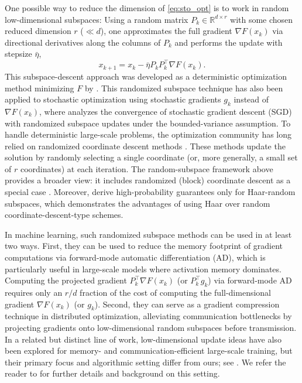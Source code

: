\documentclass[10pt]{article}
\begin{document}
One possible way to reduce the dimension of \eqref{eq:sto_opt} is to work in random low-dimensional subspaces: Using a random matrix $P_k \in \mathbb{R}^{d \times r}$ with some chosen reduced dimension $r$ ($\ll d$), one approximates the full gradient $\nabla F(x_k)$ via directional derivatives along the columns of $P_k$ and performs the update with stepsize $\bar{\eta}$,
\[
  x_{k+1} = x_k - \bar{\eta} P_k P_k^\top \nabla F(x_k).
\]
This subspace-descent approach was developed as a deterministic optimization method minimizing $F$ by \citet{kozak2021}. This randomized subspace technique has also been applied to stochastic optimization using stochastic gradients $g_k$ instead of $\nabla F(x_k)$, where \citet{flynn2024} analyzes the convergence of stochastic gradient descent (SGD) with 
randomized subspace updates under the bounded-variance assumption. To handle deterministic large-scale problems, the optimization community has long relied on randomized coordinate descent methods \cite{nesterov2012,richtarik2014,wright2015}.
These methods update the solution by randomly selecting a single coordinate (or, more generally, a small set of $r$ coordinates) at each iteration.
The random-subspace framework above provides a broader view: it includes randomized (block) coordinate descent as a special case \cite{kozak2021}.
Moreover, \citet{kozak2021} derive high-probability guarantees only for Haar-random subspaces, which demonstrates the advantages of using Haar over random coordinate-descent-type schemes.


In machine learning, such randomized subspace methods can be used in at least two ways.
First, they can be used to reduce the memory footprint of gradient computations via forward-mode automatic differentiation (AD), which is particularly useful in large-scale models where activation memory dominates. 
 Computing the projected gradient $P_k^\top \nabla F(x_k)$ (or $P_k^\top g_k$)  via forward-mode AD requires only an $r/d$ fraction of the cost of computing the full-dimensional gradient $\nabla F(x_k)$ (or $g_k$).
Second, they can serve as a gradient compression technique in distributed optimization, alleviating communication bottlenecks by projecting gradients onto low-dimensional random subspaces before transmission.
In a related but distinct line of work, low-dimensional update ideas have also been explored for memory- and communication-efficient large-scale training, but their primary focus and algorithmic setting differ from ours; see .
We refer the reader to  for further details and background on this setting.
\end{document}
